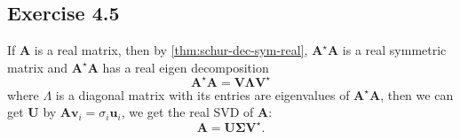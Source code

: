 \documentclass{article}
\begin{document}
\subsection{Exercise 4.5}
If $\bm{A}$ is a real matrix, then by \autoref{thm:schur-dec-sym-real}, $\bm{A^\star A}$ is a real symmetric matrix and $\bm{A^\star A}$ has a real eigen decomposition
$$
\bm{A}^\star \bm{A} = \bm{V} \bm{\Lambda} \bm{V}^{\star}
$$
where $\Lambda$ is a diagonal matrix with its entries are eigenvalues of $\bm{A^\star A}$, then we can get $\bm{U}$ by $\bm{A} \bm{v}_i = \sigma_i \bm{u}_i$, we get the real SVD of $\bm{A}$:
$$
\bm{A} = \bm{U} \bm{\Sigma} \bm{V}^\star.
$$
\end{document}
